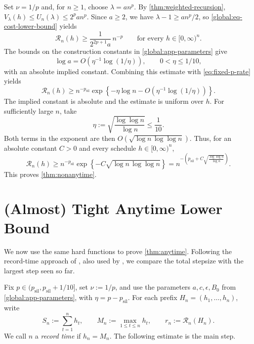 \documentclass[11pt,letterpaper]{article}
\theoremstyle{definition}
\newcommand{\psil}{p_{\mathrm{sil}}}
\begin{document}
Set $\nu=1/p$ and, for $n\ge1$, choose $\lambda=an^p$.
By \cref{thm:weighted-recursion}, $V_\lambda(h)\le U_n(\lambda)\le2^pan^p$.
Since $a\ge2$, we have $\lambda-1\ge an^p/2$, so \eqref{global:eq-cost-lower-bound} yields
\begin{equation}
  \mathcal R_n(h)\ge\frac{1}{2^{2p+1}a}\,n^{-p}
  \qquad\text{for every }h\in[0,\infty)^n.
  \label{eq:fixed-p-rate}
\end{equation}
The bounds on the construction constants in \cref{global:app-parameters} give
\begin{equation}
\label{eq:parameter-growth}
 \log a=O\!\left(\eta^{-1}\log(1/\eta)\right), \qquad 0<\eta\le1/10,
\end{equation}
with an absolute implied constant.
Combining this estimate with \eqref{eq:fixed-p-rate} yields
\begin{equation*}
 \mathcal R_n(h)\ge n^{-\psil} \exp\!\left\{-\eta\log n-O\!\left(\eta^{-1}\log(1/\eta)\right)\right\}.
\end{equation*}
The implied constant is absolute and the estimate is uniform over $h$.
For sufficiently large $n$, take
\begin{equation*}
 \eta:=\sqrt{\frac{\log\log n}{\log n}}\le\frac{1}{10}.
\end{equation*}
Both terms in the exponent are then $O(\sqrt{\log n\,\log\log n})$.
Thus, for an absolute constant $C>0$ and every schedule $h\in[0,\infty)^n$,
\begin{equation*}
 \mathcal R_n(h)\ge n^{-\psil} \exp\!\left\{-C\sqrt{\log n\,\log\log n}\right\} =n^{-\left(\psil+C\sqrt{\frac{\log\log n}{\log n}}\right)}.
\end{equation*}
This proves \cref{thm:nonanytime}.
\popQED

\section{(Almost) Tight Anytime Lower Bound}
\label{sec:anytime}

We now use the same hard functions to prove \cref{thm:anytime}.
Following the record-time approach of \citet[Section~4.1]{TsaiFatkhullinZhangHe2026}, also used by \citet[Section~4]{JungChoYun2026}, we compare the total stepsize with the largest step seen so far.

Fix $p\in(\psil,\psil+1/10]$, set $\nu:=1/p$, and use the parameters $a,c,\epsilon,B_0$ from \cref{global:app-parameters}, with $\eta=p-\psil$.
For each prefix $H_n=(h_1,\ldots,h_n)$, write
\[
    S_n:=\sum_{t=1}^n h_t,
    \qquad M_n:=\max_{1\le t\le n}h_t,
    \qquad r_n:=\mathcal R_n(H_n).
\]
We call $n$ a \emph{record time} if $h_n=M_n$.
The following estimate is the main step.
\end{document}
